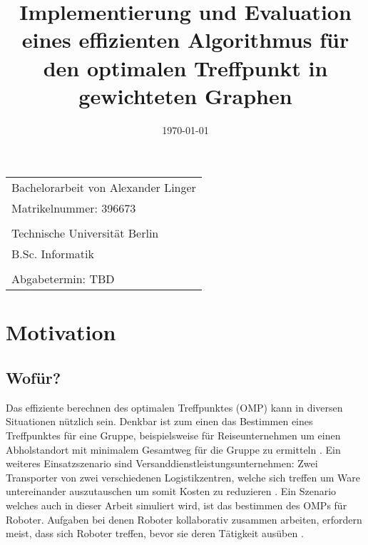\documentclass[a4paper, 12pt]{article}
\title{\huge Implementierung und Evaluation eines effizienten Algorithmus für den optimalen Treffpunkt in gewichteten Graphen}
\date{\today}
\author{}
\begin{document}
\maketitle
\vspace*{\fill}
\begin{flushleft}
\begin{tabular}{l}
Bachelorarbeit von Alexander Linger \\
Matrikelnummer: 396673 \\
\\
Technische Universität Berlin \\
B.Sc. Informatik
\\
\\
Abgabetermin: TBD
\end{tabular}
\end{flushleft}
\newpage
\section{Motivation}
\subsection{Wofür?}
Das effiziente berechnen des optimalen Treffpunktes (OMP) kann in diversen Situationen nützlich sein. Denkbar ist zum einen das Bestimmen eines Treffpunktes für eine Gruppe, beispielsweise für Reiseunternehmen um einen Abholstandort mit minimalem Gesamtweg für die Gruppe zu ermitteln \cite[vgl.][S. 277]{Tiwari_Kaushik_2013}. Ein weiteres Einsatzszenario sind Versanddienstleistungsunternehmen: Zwei Transporter von zwei verschiedenen Logistikzentren, welche sich treffen um Ware untereinander auszutauschen um somit Kosten zu reduzieren \cite[vgl.][S.1 f.]{huang_meet_2018}. Ein Szenario welches auch in dieser Arbeit simuliert wird, ist das bestimmen des OMPs für Roboter. Aufgaben bei denen Roboter kollaborativ zusammen arbeiten, erfordern meist, dass sich Roboter treffen, bevor sie deren Tätigkeit ausüben \cite[vgl.][S. 107]{Lanthier_Nussbaum_Wang_2005}.
\end{document}
